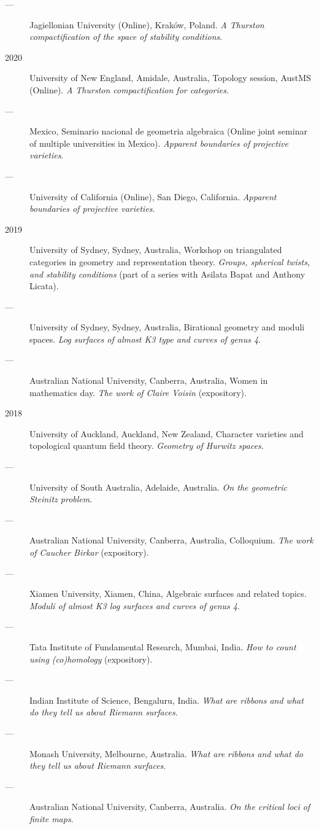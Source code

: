\documentclass[11pt]{article}
\begin{document}
\begin{description}
\item[{---}] Jagiellonian University (Online), Kraków, Poland. \emph{A Thurston compactification of the space of stability conditions}.
\item[{2020}] University of New England, Amidale, Australia, Topology session, AustMS (Online). \emph{A Thurston compactification for categories}.
\item[{---}] Mexico, Seminario nacional de geometria algebraica (Online joint seminar of multiple universities in Mexico). \emph{Apparent boundaries of projective varieties}.
\item[{---}] University of California (Online), San Diego, California. \emph{Apparent boundaries of projective varieties}.
\item[{2019}] University of Sydney, Sydney, Australia, Workshop on triangulated categories in geometry and representation theory. \emph{Groups, spherical twists, and stability conditions} (part of a series with Asilata Bapat and Anthony Licata).
\item[{---}] University of Sydney, Sydney, Australia, Birational geometry and moduli spaces. \emph{Log surfaces of almost K3 type and curves of genus 4}.
\item[{---}] Australian National University, Canberra, Australia, Women in mathematics day. \emph{The work of Claire Voisin} (expository).
\item[{2018}] University of Auckland, Auckland, New Zealand, Character varieties and topological quantum field theory. \emph{Geometry of Hurwitz spaces}.
\item[{---}] University of South Australia, Adelaide, Australia. \emph{On the geometric Steinitz problem}.
\item[{---}] Australian National University, Canberra, Australia, Colloquium. \emph{The work of Caucher Birkar} (expository).
\item[{---}] Xiamen University, Xiamen, China, Algebraic surfaces and related topics. \emph{Moduli of almost K3 log surfaces and curves of genus 4}.
\item[{---}] Tata Institute of Fundamental Research, Mumbai, India. \emph{How to count using (co)homology} (expository).
\item[{---}] Indian Institute of Science, Bengaluru, India. \emph{What are ribbons and what do they tell us about Riemann surfaces}.
\item[{---}] Monash University, Melbourne, Australia. \emph{What are ribbons and what do they tell us about Riemann surfaces}.
\item[{---}] Australian National University, Canberra, Australia. \emph{On the critical loci of finite maps}.

\end{description}
\end{document}

